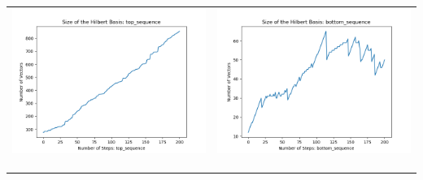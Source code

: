 \documentclass[10pt]{article}
\begin{document}
\begin{tabular}{c|c}
\begin{minipage}{.45\textwidth}
\includegraphics[width=\textwidth]{"DATA/5d/6 generators 2 bound F/top_sequence SIZE"}
\end{minipage} &
\begin{minipage}{.45\textwidth}
\includegraphics[width=\textwidth]{"DATA/5d/6 generators 2 bound F bottomup/bottom_sequence SIZE"}
\end{minipage} \\ \\
\hline \\\begin{minipage}{.45\textwidth}

\end{minipage}
\end{tabular}
\end{document}

